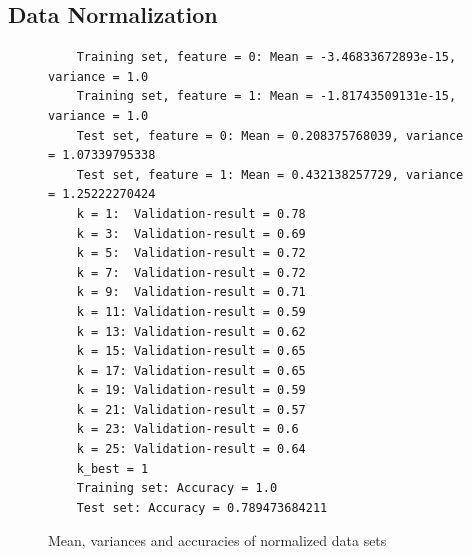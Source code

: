 \documentclass[a4paper]{article}
\begin{document}
\subsection{Data Normalization}


\begin{figure}[H]
	\begin{lstlisting}
	Training set, feature = 0: Mean = -3.46833672893e-15, variance = 1.0
	Training set, feature = 1: Mean = -1.81743509131e-15, variance = 1.0
	Test set, feature = 0: Mean = 0.208375768039, variance = 1.07339795338
	Test set, feature = 1: Mean = 0.432138257729, variance = 1.25222270424
	k = 1:  Validation-result = 0.78
	k = 3:  Validation-result = 0.69
	k = 5:  Validation-result = 0.72
	k = 7:  Validation-result = 0.72
	k = 9:  Validation-result = 0.71
	k = 11: Validation-result = 0.59
	k = 13: Validation-result = 0.62
	k = 15: Validation-result = 0.65
	k = 17: Validation-result = 0.65
	k = 19: Validation-result = 0.59
	k = 21: Validation-result = 0.57
	k = 23: Validation-result = 0.6
	k = 25: Validation-result = 0.64
	k_best = 1
	Training set: Accuracy = 1.0
	Test set: Accuracy = 0.789473684211
	\end{lstlisting}
	\caption{Mean, variances and accuracies of normalized data sets}
	\label{fig:normalization_results}
\end{figure}
\end{document}
